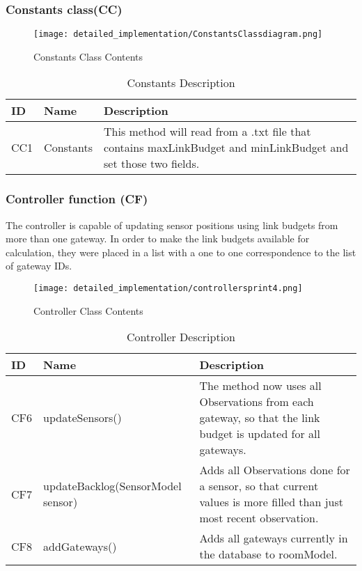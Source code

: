 \documentclass[../document]{subfiles}
\begin{document}
\subsubsection{Constants class(CC)}

\begin{figure}[H]
\centering
\texttt{[image: detailed\_implementation/ConstantsClassdiagram.png]}
\caption{Constants Class Contents}
\end{figure}

\begin{table}[H]
\caption{Constants Description}
\centering
\begin{tabularx}{\textwidth}{|L{1.2cm}|L{3.5cm}|X|}
\hline ID
&Name
&Description
\\ \hline 
CC1
&Constants
&This method will read from a .txt file that contains maxLinkBudget and minLinkBudget and set those two fields.
\\ \hline 
\end{tabularx}
\end{table}

\subsubsection{Controller function (CF)}
The controller is capable of updating sensor positions using link budgets from more than one gateway. In order to make the link budgets available for calculation, they were placed in a list with a one to one correspondence to the list of gateway IDs.

\begin{figure}[H]
\centering
\texttt{[image: detailed\_implementation/controllersprint4.png]}
\caption{Controller Class Contents}
\end{figure}

\begin{table}[H]
\caption{Controller Description}
\centering
\begin{tabularx}{\textwidth}{|L{1cm}|L{4.5cm}|X|}
\hline ID
&Name
&Description
\\ \hline CF6
&updateSensors()
&The method now uses all Observations from each gateway, so that the link budget is updated for all gateways.
\\ \hline CF7 
&updateBacklog(SensorModel sensor)
&Adds all Observations done for a sensor, so that current values is more filled than just most recent observation.
\\ \hline CF8
&addGateways()
&Adds all gateways currently in the database to roomModel.
\\ \hline 
\end{tabularx}
\end{table}
\end{document}

